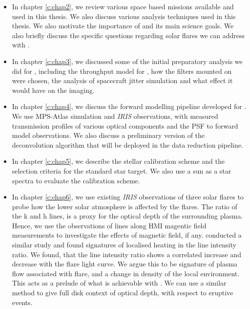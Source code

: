 \begin{itemize}
    \item In chapter \ref{c:chap2}, we review various space based missions available and used in this thesis. We also discuss various analysis techniques used in this thesis. We also motivate the importance of {\suit} and its main science goals. We also briefly discuss the specific questions regarding solar flares we can address with {\suit}.
    \item In chapter \ref{c:chap3}, we discussed some of the initial preparatory analysis we did for {\suit}, including the throughput model for {\suit}, how the filters mounted on {\suit} were chosen, the analysis of spacecraft jitter simulation and what effect it would have on the imaging.
    \item In chapter \ref{c:chap4}, we discuss the forward modelling pipeline developed for {\suit}. We use MPS-Atlas simulation and {\it IRIS} observations, with measured transmission profiles of various optical components and the PSF to forward model {\suit} observations. We also discuss a preliminary version of the deconvolution algorithm that will be deployed in the data reduction pipeline.
    \item In chapter \ref{c:chap5}, we describe the stellar calibration scheme and the selection criteria for the standard star target. We also use a sun as a star spectra to evaluate the calibration scheme.
    \item In chapter \ref{c:chap6}, we use existing {\it IRIS} observations of three solar flares to probe how the lower solar atmosphere is affected by the flares. The ratio of the  k and h lines, is a proxy for the optical depth of the surrounding plasma. Hence, we use the observations of  lines along HMI magentic field measurements to investigate the effects of magnetic field, if any. \cite{kerr15} conducted a similar study and found signatures of localised heating in the line intensity ratio. We found, that the line intensity ratio shows a correlated increase and decrease with the flare light curve. We argue this to be signature of plasma flow associated with flare, and a change in density of the local environment. This acts as a prelude of what is achievable with {\suit}. We can use a similar method to give full disk context of optical depth, with respect to eruptive events.
\end{itemize}
